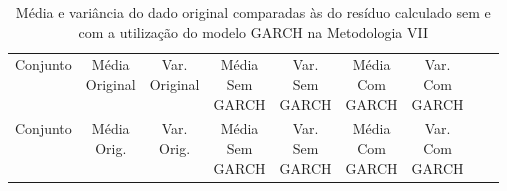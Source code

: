 \clearpage

\begin{center}
\begin{longtable}{ccccccccc}
\toprule
\rowcolor{white}
\caption[Metodologia VII: dados estatísticos]{Média e variância do dado original
comparadas às do resíduo calculado sem e com a utilização do modelo GARCH na
Metodologia VII} \label{tab:DadosEstatisticosMet7}\\
\midrule
    Conjunto & \specialcell{Média\\Original} &
    \specialcell{Var.\\Original} & \specialcell{Média\\Sem\\GARCH} &
    \specialcell{Var.\\Sem\\GARCH} & \specialcell{Média\\Com\\GARCH}&
    \specialcell{Var.\\Com\\GARCH} \\

\midrule
\endfirsthead 
\midrule
\rowcolor{white}
    Conjunto & \specialcell{Média\\Orig.} &
    \specialcell{Var.\\Orig.} & \specialcell{Média\\Sem\\GARCH} &
    \specialcell{Var.\\Sem\\GARCH} & \specialcell{Média\\Com\\GARCH}&
    \specialcell{Var.\\Com\\GARCH} \\


\end{longtable}
\end{center}
